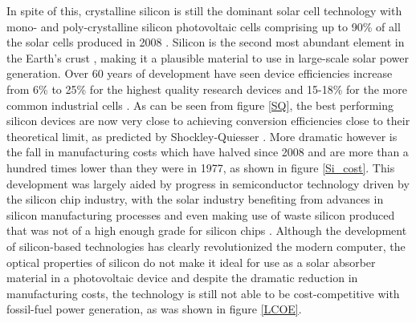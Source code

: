 In spite of this, crystalline silicon is still the dominant solar cell technology with mono- and poly-crystalline silicon photovoltaic cells comprising up to 90\% of all the solar cells produced in 2008  \cite{Si_rev}. Silicon is the second most abundant element in the Earth's crust \cite{Si_abundance}, making it a plausible material to use in large-scale solar power generation. Over 60 years of development have seen device efficiencies increase from 6\% to 25\% for the highest quality research devices and 15-18\% for the more common industrial cells \cite{Si_rev}. As can be seen from figure \ref{SQ}, the best performing silicon devices are now very close to achieving conversion efficiencies close to their theoretical limit, as predicted by Shockley-Quiesser \cite{SQ_1961}. More dramatic however is the fall in manufacturing costs which have halved since 2008 and are more than a hundred times lower than they were in 1977, as shown in figure \ref{Si_cost}. This development was largely aided by progress in semiconductor technology driven by the silicon chip industry, with the solar industry benefiting from advances in silicon manufacturing processes and even making use of waste silicon produced that was not of a high enough grade for silicon chips \cite{PV_history1}. Although the development of silicon-based technologies has clearly revolutionized the modern computer, the optical properties of silicon do not make it ideal for use as a solar absorber material in a photovoltaic device and despite the dramatic reduction in manufacturing costs, the technology is still not able to be cost-competitive with fossil-fuel power generation, as was shown in figure \ref{LCOE}.\\

